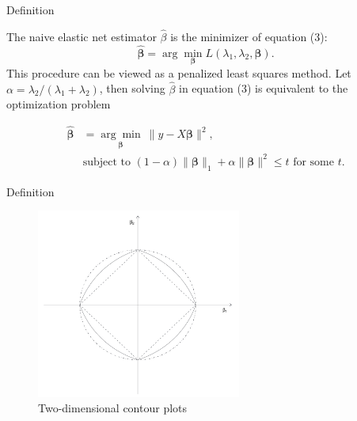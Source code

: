 \begin{frame}{Definition}

The naive elastic net estimator $\hat{\beta}$ is the minimizer of equation (3):
\begin{equation}
\hat{\mathbf{\beta}} = \arg\min_{\mathbf{\beta}} L(\lambda_1, \lambda_2, \mathbf{\beta}).
\end{equation}
This procedure can be viewed as a penalized least squares method. Let $\alpha = \lambda_2 / (\lambda_1 + \lambda_2)$, then solving $\hat{\beta}$ in equation (3) is equivalent to the optimization problem

\vspace{10pt}

\begin{equation}
\begin{aligned}
\hat{\mathbf{\beta}} &= \underset{\mathbf{\beta}}{\arg\min} \ \|y - X\mathbf{\beta}\|^2, \\
&\text{subject to } (1 - \alpha) \|\mathbf{\beta}\|_1 + \alpha \|\mathbf{\beta}\|^2 \leq t \text{ for some } t.
\end{aligned}
\end{equation}

\end{frame}


    \begin{frame}{Definition}
        \begin{figure}
            \centering
            \includegraphics[width=0.6\textwidth]{img/image1.png}
            \caption{Two-dimensional contour plots}
        \end{figure}
    \end{frame}

